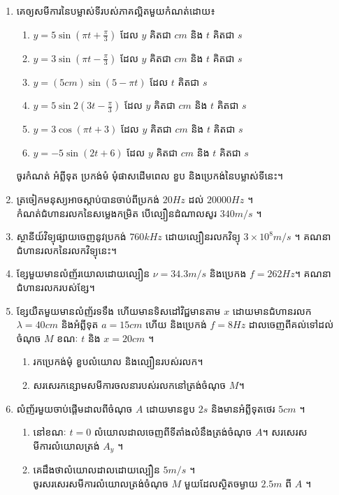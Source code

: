 \documentclass{officialexam}
\begin{document}
	\begin{enumerate}[m]
		\item គេឲ្យសមីការនៃបម្លាស់ទីរបស់ភាគល្អិតមួយកំណត់ដោយ៖
		 \begin{enumerate}[k, 2]
		 	\item $y=5\sin\left(\pi t + \frac{\pi}{3}\right)$ ដែល $y$ គិតជា $cm$ និង $t$ គិតជា $s$
		 	\item $y=3\sin\left(\pi t-\frac{\pi}{3}\right)$ ដែល $y$ គិតជា $cm$ និង $t$ គិតជា $s$
		 	\item $y=\left(5cm\right)\sin\left(5-\pi t\right)$ ដែល $t$ គិតជា $s$
		 	\item $y=5\sin2\left(3t-\frac{\pi}{3}\right)$ ដែល $y$ គិតជា $cm$ និង $t$ គិតជា $s$
		 	\item $y=3\cos\left(\pi t + 3\right)$ ដែល $y$ គិតជា $cm$ និង $t$ គិតជា $s$
		 	\item $y=-5\sin\left(2t+6\right)$ ដែល $y$ គិតជា $cm$ និង $t$ គិតជា $s$
		 \end{enumerate}
		 ចូរកំណត់ អំព្លីទុត ប្រកង់មំ មុំផាសដើមពេល ខួប និងប្រេកង់នៃបម្លាស់ទីនេះ។
		 \item ត្រចៀកមនុស្យអាចស្តាប់បានចាប់ពីប្រកង់ $20Hz$ ដល់ $20000Hz$ ។ \\
		 កំណត់ជំហានរលកនៃសម្លេងកម្រិត បើល្បឿនដំណាលសូរ $340m/s$ ។
		 \item ស្ថានីយ៍វិទ្យុផ្សាយចេញនូវប្រកង់ $760kHz$ ដោយល្បឿនរលកវិទ្យុ $3\times10^{8}m/s$ ។ គណនាជំហានរលកនៃរលកវិទ្យុនេះ។
		 \item ខ្សែមួយមានលំញ័រយោលដោយល្បឿន $\nu = 34.3m/s$ និងប្រេកង $f=262Hz$។ គណនាជំហានរលករបស់ខ្សែ។
		 \item ខ្សែយឺតមួយមានលំញ័រទទឹង ហើយមានទិសដៅវិជ្ជមានតាម $x$ ដោយមានជំហានរលក $\lambda=40cm$ និងអំព្លីទុត $a=15cm$ ហើយ និងប្រេកង់ $f=8Hz$ ដាលចេញពីគល់ទៅដល់ចំណុច $M$ ខណៈ $t$ និង $x=20cm$ ។
		 \begin{enumerate}[k]
		 	\item រកប្រេកង់មុំ ខួបលំយោល និងល្បឿនរបស់រលក។
		 	\item សរសេរកន្សោមសមីការចលនារបស់រលកនៅត្រង់ចំណុច $M$។
		 \end{enumerate}
	 	\item លំញ័រមួយចាប់ផ្តើមដាលពីចំណុច $A$ ដោយមានខួប $2s$ និងមានអំព្លីទុតថេរ $5cm$ ។
	 	\begin{enumerate}[k]
	 		\item នៅខណៈ $t=0$ លំយោលដាលចេញពីទីតាំងលំនឹងត្រង់ចំណុច $A$។ សរសេរសមីការលំយោលត្រង់ $A_y$ ។
	 		\item គេដឹងថាលំយោលដាលដោយល្បឿន $5m/s$ ។\\
	 		ចូរសរសេរសមីការលំយោលត្រង់ចំណុច $M$ មួយដែលស្ថិតចម្ងាយ $2.5m$ ពី $A$ ។

\end{enumerate}
\end{enumerate}
\end{document}
